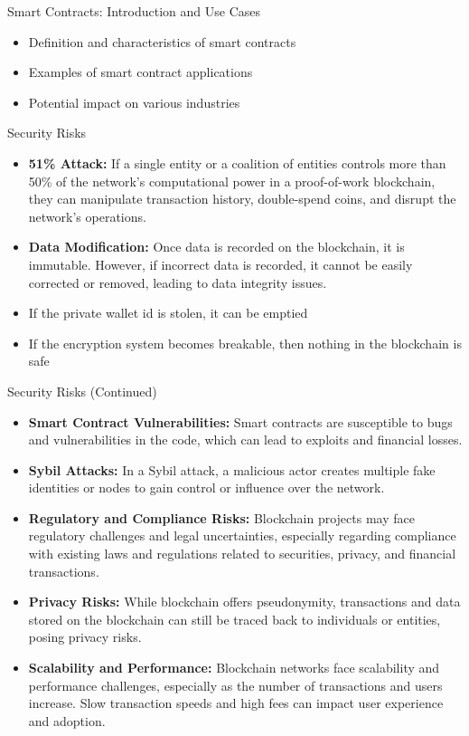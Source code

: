 \begin{withoutheadline}
\begin{frame}{Smart Contracts: Introduction and Use Cases}
    \begin{itemize}
        \item Definition and characteristics of smart contracts
        \item Examples of smart contract applications
        \item Potential impact on various industries
    \end{itemize}
\end{frame}

\begin{frame}{Security Risks}
    \begin{itemize}
        \item \textbf{51\% Attack:} If a single entity or a coalition of entities controls more than 50\% of the network's computational power in a proof-of-work blockchain, they can manipulate transaction history, double-spend coins, and disrupt the network's operations.
        \item \textbf{Data Modification:} Once data is recorded on the blockchain, it is immutable. However, if incorrect data is recorded, it cannot be easily corrected or removed, leading to data integrity issues.
        \item If the private wallet id is stolen, it can be emptied
        \item If the encryption system becomes breakable, then nothing in the blockchain is safe
    \end{itemize}
\end{frame}

\begin{frame}{Security Risks (Continued)}
    \begin{itemize}
    \item \textbf{Smart Contract Vulnerabilities:} Smart contracts are susceptible to bugs and vulnerabilities in the code, which can lead to exploits and financial losses.
    \item \textbf{Sybil Attacks:} In a Sybil attack, a malicious actor creates multiple fake identities or nodes to gain control or influence over the network.
    \item \textbf{Regulatory and Compliance Risks:} Blockchain projects may face regulatory challenges and legal uncertainties, especially regarding compliance with existing laws and regulations related to securities, privacy, and financial transactions.
    \item \textbf{Privacy Risks:} While blockchain offers pseudonymity, transactions and data stored on the blockchain can still be traced back to individuals or entities, posing privacy risks.
    \item \textbf{Scalability and Performance:} Blockchain networks face scalability and performance challenges, especially as the number of transactions and users increase. Slow transaction speeds and high fees can impact user experience and adoption.
    \end{itemize}
\end{frame}


\end{withoutheadline}
